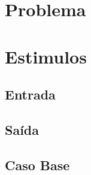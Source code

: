 \documentclass[
    12pt,
    a4paper,
    oneside,
    chapter=TITLE,
    section=TITLE,
    subsection=TITLE,
    subsubsection=TITLE,
    english,
    french,
    spanish,
    brazil,
    ]{abntex2}
\begin{document}
\frenchspacing 
\imprimircapa
\imprimirfolhaderosto

\tableofcontents*
\cleardoublepage

\textual

\chapter{Problema}



\chapter{Estimulos}
\section{Entrada}

\section{Saída}

\section{Caso Base}
\end{document}

